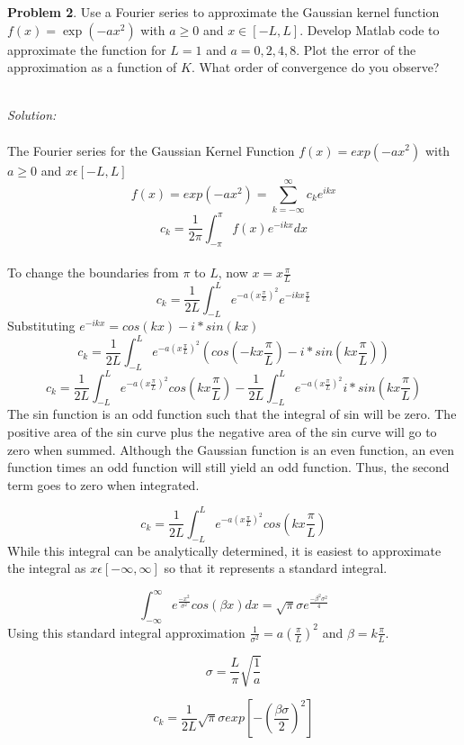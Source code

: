 \documentclass[10pt]{article}
\begin{document}
\newpage

\noindent\colorbox{mygray}{\begin{minipage}{\textwidth}
  {\bf Problem 2}. Use a Fourier series to approximate the Gaussian kernel function $f(x)=\exp(-ax^2)$ with $a\geq 0$ and $x\in [-L,L]$. Develop Matlab code to approximate the function for $L=1$ and $a=0,2,4,8$. Plot the error of the approximation as a function of $K$. What order of convergence do you observe?
  \end{minipage}}
\\

{\em Solution:}   
\\
\\
The Fourier series for the Gaussian Kernel Function $f(x)=exp(-ax^2)$ with $a\geq 0$ and $x\epsilon[-L,L]$
\[f(x)=exp(-ax^2)=\sum_{k=-\infty}^{\infty}c_ke^{ikx} \]
\[ c_k=\frac{1}{2\pi}\int_{-\pi}^{\pi}f(x)e^{-ikx}dx \]
\\
To change the boundaries from $\pi$ to $L$, now $x=x\frac{\pi}{L}$
\[ c_k=\frac{1}{2L}\int_{-L}^{L}e^{-a(x \frac{\pi}{L})^2}e^{-ikx\frac{\pi}{L}} \]
Substituting $e^{-ikx}=cos(kx)-i*sin(kx)$
\[ c_k=\frac{1}{2L}\int_{-L}^{L}e^{-a(x \frac{\pi}{L})^2} \left(cos(-kx\frac{\pi}{L})-i*sin(kx\frac{\pi}{L})\right) \]
\[ c_k=\frac{1}{2L}\int_{-L}^{L}e^{-a(x \frac{\pi}{L})^2} cos(kx\frac{\pi}{L})-\frac{1}{2L}\int_{-L}^{L}e^{-a(x \frac{\pi}{L})^2}i*sin(kx\frac{\pi}{L}) \]
The sin function is an odd function such that the integral of sin will be zero. The positive area of the sin curve plus the negative area of the sin curve will go to zero when summed. Although the Gaussian function is an even function, an even function times an odd function will still yield an odd function. Thus, the second term goes to zero when integrated.

\[ c_k=\frac{1}{2L}\int_{-L}^{L}e^{-a(x \frac{\pi}{L})^2} cos(kx\frac{\pi}{L}) \]
While this integral can be analytically determined, it is easiest to approximate the integral as $x\epsilon[-\infty,\infty]$ so that it represents a standard integral. 

\[ \int_{-\infty}^{\infty}e^{\frac{-x^2}{\sigma^2}}cos(\beta x)dx= \sqrt{\pi}\sigma e^{\frac{-\beta^2\sigma^2}{4}}\]
Using this standard integral approximation $\frac{1}{\sigma^2}=a(\frac{\pi}{L})^2$ and $\beta = k\frac{\pi}{L}$. 

\[ \sigma=\frac{L}{\pi}\sqrt{\frac{1}{a}} \]

\[ c_k=\frac{1}{2L}\sqrt{\pi}\sigma exp\left[ -(\frac{\beta\sigma}{2})^2   \right] \]
\end{document}
